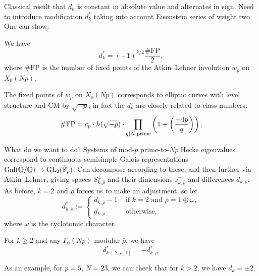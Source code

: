 \documentclass[reqno]{amsart} 
\begin{document}
Classical result that $d_k$ is constant in absolute value and alternates in sign.  Need to introduce modification $d_k^\ast$ taking into account Eisenstein series of weight two.  One can show:
\begin{theorem}
  We have
  \begin{equation*}
    d_k^\ast =(- 1)^{k/2} \frac{\# \mathrm{FP}}{2},
  \end{equation*}
  where $\# \mathrm{FP}$ is the number of fixed points of the Atkin--Lehner involution $w_p$ on $X_0(N p)$.
\end{theorem}
The fixed points of $w_p$ on $X_0(N p)$ corresponds to elliptic curves with level structure and CM by $\sqrt{- p}$, in fact the $d_k$ are closely related to class numbers:
\begin{equation*}
  \# \mathrm{FP}
  = c_p \cdot h(\sqrt{-p}) \cdot \prod_{q \mid N, \text{prime}}
  \left( 1 + \left( \frac{- 4 p}{q} \right) \right).
\end{equation*}

What do we want to do?  Systems of mod-$p$ prime-to-$N p$ Hecke eigenvalues correspond to continuous semisimple Galois representations $\operatorname{Gal}(\bar{\mathbb{Q}} / \mathbb{Q})  \rightarrow \operatorname{GL}_2(\bar{\mathbb{F}}_p)$.  Can decompose according to these, and then further via Atkin--Lehner, giving spaces $S_{k, \bar{\rho}}^{\pm}$ and their dimensions $s_{k, \bar{\rho}}^{\pm}$ and differences $d_{k, \bar{\rho}}$.  As before, $k = 2$ and $\bar{\rho}$ forces us to make an adjustment, so let
\begin{equation*}
  d_{k, \bar{\rho}}^\ast :=
  \begin{cases}
    d_{k, \bar{\rho}} - 1    &  \text{ if } k = 2 \text{ and } \bar{\rho} = 1 \oplus \omega, \\
    d_{k, \bar{\rho}}                             & \text{ otherwise,}
  \end{cases}
\end{equation*}
where $\omega$ is the cyclotomic character.

\begin{theorem}
  For $k \geq 2$ and any $\Gamma_0(N p)$-modular $\bar{\rho}$, we have
  \begin{equation*}
    d^\ast_{k + 2, \bar{\rho}[1]} = - d_{k, \bar{\rho}}^\ast.
  \end{equation*}
\end{theorem}

As an example, for $p = 5$, $N= 23$, we can check that for $k > 2$, we have $d_k = \pm 2$.
\end{document}

